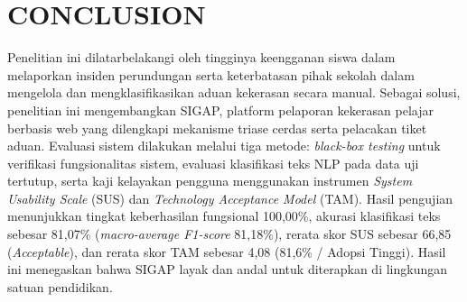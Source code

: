 \documentclass[conference]{IEEEtran}
\begin{document}
\section{CONCLUSION}

Penelitian ini dilatarbelakangi oleh tingginya keengganan siswa dalam melaporkan insiden perundungan serta keterbatasan pihak sekolah dalam mengelola dan mengklasifikasikan aduan kekerasan secara manual. Sebagai solusi, penelitian ini mengembangkan SIGAP, platform pelaporan kekerasan pelajar berbasis web yang dilengkapi mekanisme triase cerdas serta pelacakan tiket aduan. Evaluasi sistem dilakukan melalui tiga metode: \textit{black-box testing} untuk verifikasi fungsionalitas sistem, evaluasi klasifikasi teks NLP pada data uji tertutup, serta kaji kelayakan pengguna menggunakan instrumen \textit{System Usability Scale} (SUS) dan \textit{Technology Acceptance Model} (TAM). Hasil pengujian menunjukkan tingkat keberhasilan fungsional 100,00\%, akurasi klasifikasi teks sebesar 81,07\% (\textit{macro-average F1-score} 81,18\%), rerata skor SUS sebesar 66,85 (\textit{Acceptable}), dan rerata skor TAM sebesar 4,08 (81,6\% / Adopsi Tinggi). Hasil ini menegaskan bahwa SIGAP layak dan andal untuk diterapkan di lingkungan satuan pendidikan.
\end{document}
